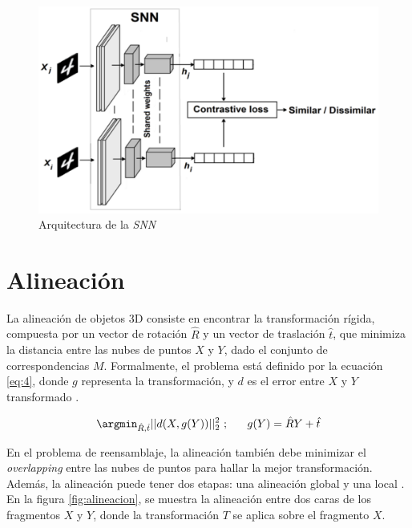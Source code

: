 \begin{figure}[!h]
    \centering
     \includegraphics[scale=0.17]{images/snn.png}
    \caption{Arquitectura de la \textit{SNN} \cite{15}}
    \label{fig:snn}
\end{figure}



\section{Alineación}
La alineación de objetos 3D consiste en encontrar la transformación rígida, compuesta por un vector de rotación $\hat{R}$ y un vector de traslación  $\hat{t}$, que minimiza la distancia entre las nubes de puntos $X$ y $Y$, dado el conjunto de correspondencias $M$. Formalmente, el problema está definido por la ecuación \ref{eq:4}, donde $g$ representa la transformación, y $d$ es el error entre $X$ y $Y$ transformado \cite{9}. 

\begin{equation} \label{eq:4}
    \argmin_{\hat{R}, \hat{t}}||d(X, g(Y))||^2_2 \ ; \ \ \ \ \ g(Y) = \hat{R}Y + \hat{t}
\end{equation}

En el problema de reensamblaje, la alineación también debe minimizar el \textit{overlapping} entre las nubes de puntos para hallar la mejor transformación. Además, la alineación puede tener dos etapas: una alineación global y una local \cite{2}. En la figura \ref{fig:alineacion}, se muestra la alineación entre dos caras de los fragmentos $X$ y $Y$, donde la transformación $T$ se aplica sobre el fragmento $X$.

